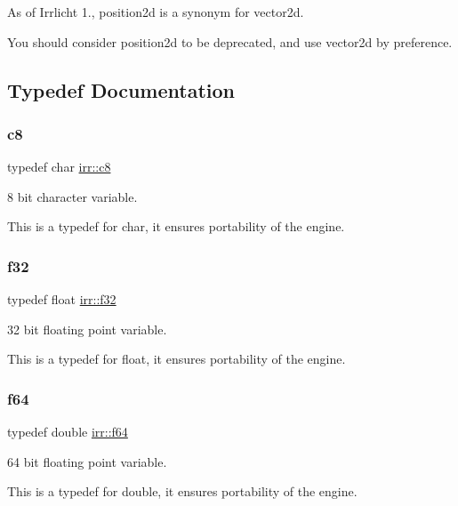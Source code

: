As of Irrlicht 1., position2d is a synonym for vector2d.

You should consider position2d to be deprecated, and use vector2d by preference. 

\subsection{Typedef Documentation}
\mbox{\label{namespaceirr_a9395eaea339bcb546b319e9c96bf7410}} 
\subsubsection{\texorpdfstring{c8}{c8}}
{\footnotesize\ttfamily typedef char \hyperlink{namespaceirr_a9395eaea339bcb546b319e9c96bf7410}{irr\+::c8}}



8 bit character variable. 

This is a typedef for char, it ensures portability of the engine. \mbox{\label{namespaceirr_a0277be98d67dc26ff93b1a6a1d086b07}} 
\subsubsection{\texorpdfstring{f32}{f32}}
{\footnotesize\ttfamily typedef float \hyperlink{namespaceirr_a0277be98d67dc26ff93b1a6a1d086b07}{irr\+::f32}}



32 bit floating point variable. 

This is a typedef for float, it ensures portability of the engine. \mbox{\label{namespaceirr_a1325b02603ad449f92c68fc640af9b28}} 
\subsubsection{\texorpdfstring{f64}{f64}}
{\footnotesize\ttfamily typedef double \hyperlink{namespaceirr_a1325b02603ad449f92c68fc640af9b28}{irr\+::f64}}



64 bit floating point variable. 

This is a typedef for double, it ensures portability of the engine. \mbox{\label{namespaceirr_a813cca9bac9fa0c1427d89720a451460}} 
